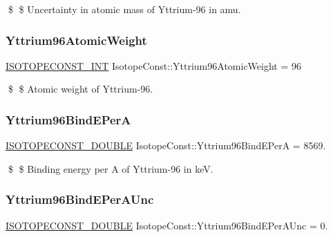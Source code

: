 \$ \$ Uncertainty in atomic mass of Yttrium-\/96 in amu. \mbox{\label{group___isotope_const-_yttrium-_y96_ga521c7f34e2087461cf78518cf9513ed6}} 
\subsubsection{\texorpdfstring{Yttrium96\+Atomic\+Weight}{Yttrium96AtomicWeight}}
{\footnotesize\ttfamily \mbox{\hyperlink{group___isotope_const-_macros_ga5f18360b3e99483a35c32d789e62621c}{I\+S\+O\+T\+O\+P\+E\+C\+O\+N\+S\+T\+\_\+\+I\+NT}} Isotope\+Const\+::\+Yttrium96\+Atomic\+Weight = 96}

\$ \$ Atomic weight of Yttrium-\/96. \mbox{\label{group___isotope_const-_yttrium-_y96_gae68783d7fe01ab2b5602b3629acc1b20}} 
\subsubsection{\texorpdfstring{Yttrium96\+Bind\+E\+PerA}{Yttrium96BindEPerA}}
{\footnotesize\ttfamily \mbox{\hyperlink{group___isotope_const-_macros_ga8f45a7272ce02c0b4c65c44636ed719a}{I\+S\+O\+T\+O\+P\+E\+C\+O\+N\+S\+T\+\_\+\+D\+O\+U\+B\+LE}} Isotope\+Const\+::\+Yttrium96\+Bind\+E\+PerA = 8569.}

\$ \$ Binding energy per A of Yttrium-\/96 in keV. \mbox{\label{group___isotope_const-_yttrium-_y96_ga80f499a61557d02bb3028f1a9818b200}} 
\subsubsection{\texorpdfstring{Yttrium96\+Bind\+E\+Per\+A\+Unc}{Yttrium96BindEPerAUnc}}
{\footnotesize\ttfamily \mbox{\hyperlink{group___isotope_const-_macros_ga8f45a7272ce02c0b4c65c44636ed719a}{I\+S\+O\+T\+O\+P\+E\+C\+O\+N\+S\+T\+\_\+\+D\+O\+U\+B\+LE}} Isotope\+Const\+::\+Yttrium96\+Bind\+E\+Per\+A\+Unc = 0.}

